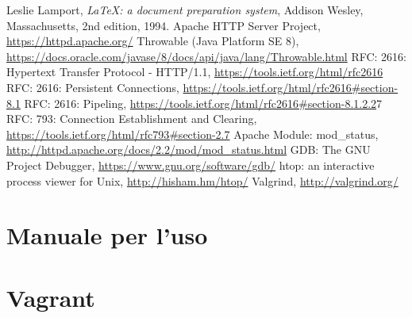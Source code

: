 \documentclass[italian]{tktltiki2}
\begin{document}
\newpage
%
%
\renewcommand{\refname}{\normalfont\selectfont\normalsize\textbf{Annotazioni}} 
\begin{thebibliography}{9}
  Leslie Lamport,
  \emph{\LaTeX: a document preparation system},
  Addison Wesley, Massachusetts,
  2nd edition,
  1994.
  Apache HTTP Server Project, \url{https://httpd.apache.org/}
  Throwable (Java Platform SE 8), \url{https://docs.oracle.com/javase/8/docs/api/java/lang/Throwable.html}
  RFC: 2616: Hypertext Transfer Protocol - HTTP/1.1, \url{https://tools.ietf.org/html/rfc2616}
  RFC: 2616: Persistent Connections, \url{https://tools.ietf.org/html/rfc2616#section-8.1}
  RFC: 2616: Pipeling, \url{https://tools.ietf.org/html/rfc2616#section-8.1.2.2}7
  RFC: 793: Connection Establishment and Clearing, \url{https://tools.ietf.org/html/rfc793#section-2.7}
  Apache Module: mod\_status, \url{http://httpd.apache.org/docs/2.2/mod/mod_status.html}
  GDB: The GNU Project Debugger, \url{https://www.gnu.org/software/gdb/}
  htop: an interactive process viewer for Unix, \url{http://hisham.hm/htop/}
  Valgrind, \url{http://valgrind.org/}
\end{thebibliography}

\newpage
\appendix
\newpage
\section{Manuale per l'uso}
\newpage
\section{Vagrant}
\end{document}
